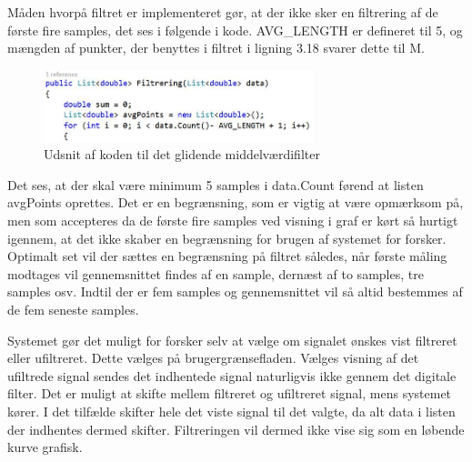 Måden hvorpå filtret er implementeret gør, at der ikke sker en filtrering af de første fire samples, det ses i følgende i kode. AVG\_LENGTH er defineret til 5, og mængden af punkter, der benyttes i filtret i ligning 3.18 svarer dette til M.

\begin{figure}[H]
	\centering
	\includegraphics[width=0.7\textwidth]{Figurer/UdsnitFilter}
	\caption{Udsnit af koden til det glidende middelværdifilter}
	\label{fig:Glidende_middelfilter}
\end{figure}

Det ses, at der skal være minimum 5 samples i data.Count førend at listen avgPoints oprettes. Det er en begrænsning, som er vigtig at være opmærksom på, men som accepteres da de første fire samples ved visning i graf er kørt så hurtigt igennem, at det ikke skaber en begrænsning for brugen af systemet for forsker. Optimalt set vil der sættes en begrænsning på filtret således, når første måling modtages vil gennemsnittet findes af en sample, dernæst af to samples, tre samples osv. Indtil der er fem samples og gennemsnittet vil så altid bestemmes af de fem seneste samples. 

Systemet gør det muligt for forsker selv at vælge om signalet ønskes vist filtreret eller ufiltreret. Dette vælges på brugergrænsefladen. Vælges visning af det ufiltrede signal sendes det indhentede signal naturligvis ikke gennem det digitale filter. Det er muligt at skifte mellem filtreret og ufiltreret signal, mens systemet kører. I det tilfælde skifter hele det viste signal til det valgte, da alt data i listen der indhentes dermed skifter. Filtreringen vil dermed ikke vise sig som en løbende kurve grafisk.

